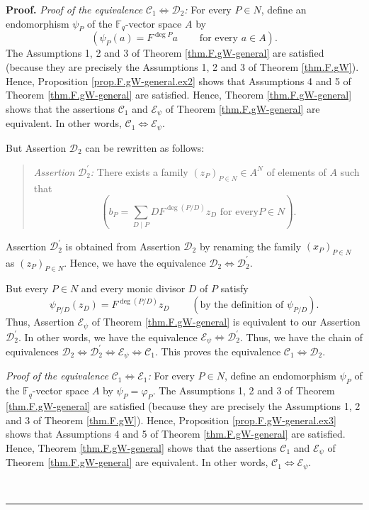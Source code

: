 \documentclass[numbers=enddot,12pt,final,onecolumn,notitlepage]{scrartcl}%
\theoremstyle{definition}
\newenvironment{statement}{\begin{quote}}{\end{quote}}
\newenvironment{proof}[1][Proof]{\noindent\textbf{#1.} }{\ \rule{0.5em}{0.5em}}
\let\sumnonlimits\sum
\renewcommand{\sum}{\sumnonlimits\limits}
\begin{document}
\begin{proof}
\textit{Proof of the equivalence }$\mathcal{C}_{1}\Longleftrightarrow
\mathcal{D}_{2}$\textit{:} For every $P\in N$, define an endomorphism
$\psi_{P}$ of the $\mathbb{F}_{q}$-vector space $A$ by%
\[
\left(  \psi_{P}\left(  a\right)  =F^{\deg P}a\ \ \ \ \ \ \ \ \ \ \text{for
every }a\in A\right)  .
\]
The Assumptions 1, 2 and 3 of Theorem \ref{thm.F.gW-general} are satisfied
(because they are precisely the Assumptions 1, 2 and 3 of Theorem
\ref{thm.F.gW}). Hence, Proposition \ref{prop.F.gW-general.ex2} shows that
Assumptions 4 and 5 of Theorem \ref{thm.F.gW-general} are satisfied. Hence,
Theorem \ref{thm.F.gW-general} shows that the assertions $\mathcal{C}_{1}$ and
$\mathcal{E}_{\psi}$ of Theorem \ref{thm.F.gW-general} are equivalent. In
other words, $\mathcal{C}_{1}\Longleftrightarrow\mathcal{E}_{\psi}$.

But Assertion $\mathcal{D}_{2}$ can be rewritten as follows:

\begin{statement}
\textit{Assertion }$\mathcal{D}_{2}^{\prime}$\textit{:} There exists a family
$\left(  z_{P}\right)  _{P\in N}\in A^{N}$ of elements of $A$ such that%
\[
\left(  b_{P}=\sum_{D\mid P}DF^{\deg\left(  P/D\right)  }z_{D}\text{ for every
}P\in N\right)  .
\]

\end{statement}

Assertion $\mathcal{D}_{2}^{\prime}$ is obtained from Assertion $\mathcal{D}%
_{2}$ by renaming the family $\left(  x_{P}\right)  _{P\in N}$ as $\left(
z_{P}\right)  _{P\in N}$. Hence, we have the equivalence $\mathcal{D}%
_{2}\Longleftrightarrow\mathcal{D}_{2}^{\prime}$.

But every $P\in N$ and every monic divisor $D$ of $P$ satisfy%
\[
\psi_{P/D}\left(  z_{D}\right)  =F^{\deg\left(  P/D\right)  }z_{D}%
\ \ \ \ \ \ \ \ \ \ \left(  \text{by the definition of }\psi_{P/D}\right)  .
\]
Thus, Assertion $\mathcal{E}_{\psi}$ of Theorem \ref{thm.F.gW-general} is
equivalent to our Assertion $\mathcal{D}_{2}^{\prime}$. In other words, we
have the equivalence $\mathcal{E}_{\psi}\Longleftrightarrow\mathcal{D}%
_{2}^{\prime}$. Thus, we have the chain of equivalences $\mathcal{D}%
_{2}\Longleftrightarrow\mathcal{D}_{2}^{\prime}\Longleftrightarrow
\mathcal{E}_{\psi}\Longleftrightarrow\mathcal{C}_{1}$. This proves the
equivalence $\mathcal{C}_{1}\Longleftrightarrow\mathcal{D}_{2}$.

\textit{Proof of the equivalence }$\mathcal{C}_{1}\Longleftrightarrow
\mathcal{E}_{1}$\textit{:} For every $P\in N$, define an endomorphism
$\psi_{P}$ of the $\mathbb{F}_{q}$-vector space $A$ by $\psi_{P}=\varphi_{P}$.
The Assumptions 1, 2 and 3 of Theorem \ref{thm.F.gW-general} are satisfied
(because they are precisely the Assumptions 1, 2 and 3 of Theorem
\ref{thm.F.gW}). Hence, Proposition \ref{prop.F.gW-general.ex3} shows that
Assumptions 4 and 5 of Theorem \ref{thm.F.gW-general} are satisfied. Hence,
Theorem \ref{thm.F.gW-general} shows that the assertions $\mathcal{C}_{1}$ and
$\mathcal{E}_{\psi}$ of Theorem \ref{thm.F.gW-general} are equivalent. In
other words, $\mathcal{C}_{1}\Longleftrightarrow\mathcal{E}_{\psi}$.


\end{proof}
\end{document}
